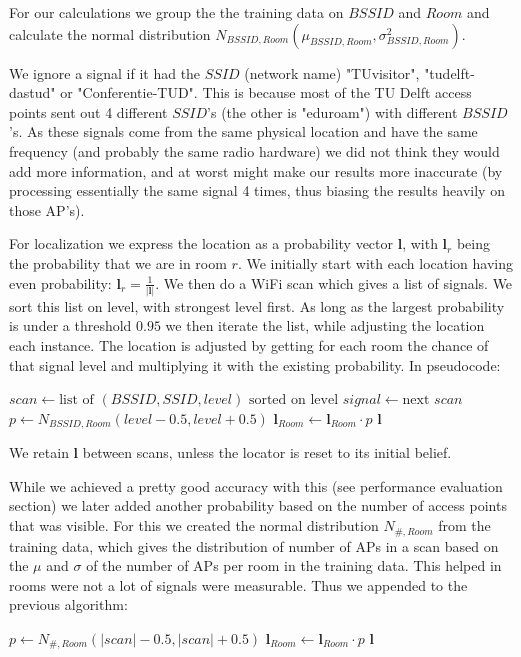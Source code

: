 \documentclass[a4paper,10pt,twoside]{IEEEtran}
\begin{document}
For our calculations we group the the training data on $BSSID$ and $Room$ and calculate the normal distribution $N_{BSSID,Room}(\mu_{BSSID,Room}, \sigma^2_{BSSID,Room})$.

We ignore a signal if it had the $SSID$ (network name) "TUvisitor", "tudelft-dastud" or "Conferentie-TUD".
This is because most of the TU Delft access points sent out 4 different $SSID$'s (the other is "eduroam") with different $BSSID$'s.
As these signals come from the same physical location and have the same frequency (and probably the same radio hardware) we did not think they would add more information, and at worst might make our results more inaccurate (by processing essentially the same signal 4 times, thus biasing the results heavily on those AP's).

For localization we express the location as a probability vector $\mathbf{l}$, with $\mathbf{l}_{r}$ being the probability that we are in room $r$. 
We initially start with each location having even probability: $\mathbf{l}_r = \frac{1}{|\mathbf{l}|}$.
We then do a WiFi scan which gives a list of signals.
We sort this list on level, with strongest level first.
As long as the largest probability is under a threshold $0.95$ we then iterate the list, while adjusting the location each instance.
The location is adjusted by getting for each room the chance of that signal level and multiplying it with the existing probability.
In pseudocode:
\begin{algorithmic}
	\State $scan \gets \text{list of } (BSSID, SSID, level) \text{ sorted on level}$
		\State $signal \gets \text{next } scan$
			\State $p \gets N_{BSSID,Room}(level-0.5,level+0.5)$
			\State $\mathbf{l}_{Room} \gets \mathbf{l}_{Room} \cdot p $
		\EndFor
		\State {} $\mathbf{l}$
	\EndWhile
\end{algorithmic}

We retain $\mathbf{l}$ between scans, unless the locator is reset to its initial belief.

While we achieved a pretty good accuracy with this (see performance evaluation section) we later added another probability based on the number of access points that was visible.
For this we created the normal distribution $N_{\#,Room}$ from the training data, which gives the distribution of number of APs in a scan based on the $\mu$ and $\sigma$ of the number of APs per room in the training data.
This helped in rooms were not a lot of signals were measurable. Thus we appended to the previous algorithm:
\begin{algorithmic}
			\State $p \gets N_{\#,Room}(|scan|-0.5,|scan|+0.5)$
			\State $\mathbf{l}_{Room} \gets \mathbf{l}_{Room} \cdot p $
		\EndFor
		\State {} $\mathbf{l}$
	\EndIf
\end{algorithmic}
\end{document}
